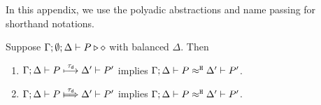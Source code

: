 
%			
%
In this appendix, we use the polyadic abstractions and name passing 
for shorthand notations. 








\begin{proposition}
	\label{app:lem:tau_inert}
	Suppose $\Gamma; \emptyset; \Delta \vdash P \triangleright \diamond$  with balanced $\Delta$.
	Then
	\begin{enumerate}[1.]
		\item	$\Gamma; \Delta \vdash P \stackrel{\tau_{\mathsf{d}}}{\longmapsto} \Delta' \vdash P'$ implies
			$\Gamma; \Delta \vdash P \approx^\mathtt{H} \Delta' \vdash P'$.
		\item	$\horel{\Gamma}{\Delta}{P}{\Hby{\dtau}}{\Delta'}{P'}$ implies
			$\Gamma; \Delta \vdash P \approx^\mathtt{H} \Delta' \vdash P'$.
	\end{enumerate}
\end{proposition}

